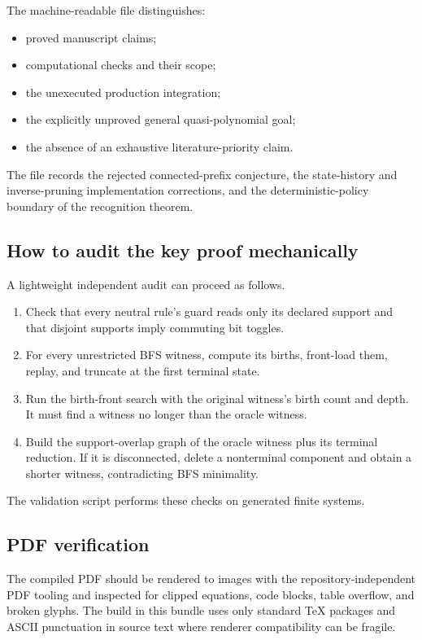 The machine-readable file  distinguishes:
\begin{itemize}
\item proved manuscript claims;
\item computational checks and their scope;
\item the unexecuted production integration;
\item the explicitly unproved general quasi-polynomial goal;
\item the absence of an exhaustive literature-priority claim.
\end{itemize}
The file  records the rejected connected-prefix
conjecture, the state-history and inverse-pruning implementation corrections,
and the deterministic-policy boundary of the recognition theorem.

\subsection{How to audit the key proof mechanically}

A lightweight independent audit can proceed as follows.
\begin{enumerate}
\item Check that every neutral rule's guard reads only its declared support and
      that disjoint supports imply commuting bit toggles.
\item For every unrestricted BFS witness, compute its births, front-load them,
      replay, and truncate at the first terminal state.
\item Run the birth-front search with the original witness's birth count and
      depth.  It must find a witness no longer than the oracle witness.
\item Build the support-overlap graph of the oracle witness plus its terminal
      reduction.  If it is disconnected, delete a nonterminal component and
      obtain a shorter witness, contradicting BFS minimality.
\end{enumerate}
The validation script performs these checks on generated finite systems.

\subsection{PDF verification}

The compiled PDF should be rendered to images with the repository-independent
PDF tooling and inspected for clipped equations, code blocks, table overflow,
and broken glyphs.  The build in this bundle uses only standard TeX packages and
ASCII punctuation in source text where renderer compatibility can be fragile.


